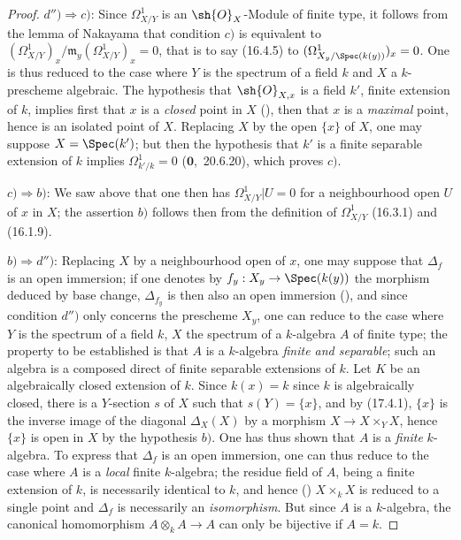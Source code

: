 \begin{proof}
$d'')\Rightarrow c)$: Since $\Omega^1_{X/Y}$ is an $\sh{O}_X$-Module of finite type, it follows from the lemma of Nakayama that condition $c)$ is equivalent to $(\Omega^1_{X/Y})_x/\mathfrak{m}_y(\Omega^1_{X/Y})_x=0$, that is to say (16.4.5) to $(\Omega^1_{X_y/\Spec(k(y))})_x=0$.
One is thus reduced to the case where $Y$ is the spectrum of a field $k$ and $X$ a $k$-prescheme algebraic.
The hypothesis that $\sh{O}_{X,x}$ is a field $k'$, finite extension of $k$, implies first that $x$ is a \emph{closed} point in $X$ (), then that $x$ is a \emph{maximal} point, hence is an isolated point of $X$.
Replacing $X$ by the open $\{x\}$ of $X$, one may suppose $X=\Spec(k')$; but then the hypothesis that $k'$ is a finite separable extension of $k$ implies $\Omega^1_{k'/k}=0$ ($\mathbf{0}$,~20.6.20), which proves $c)$.

$c)\Rightarrow b)$: We saw above that one then has $\Omega^1_{X/Y}|U=0$ for a neighbourhood open $U$ of $x$ in $X$; the assertion $b)$ follows then from the definition of $\Omega^1_{X/Y}$ (16.3.1) and (16.1.9).

$b)\Rightarrow d'')$: Replacing $X$ by a neighbourhood open of $x$, one may suppose that $\Delta_f$ is an open immersion; if one denotes by $f_y:X_y\to\Spec(k(y))$ the morphism deduced by base change, $\Delta_{f_y}$ is then also an open immersion (), and since condition $d'')$ only concerns the prescheme $X_y$, one can reduce to the case where $Y$ is the spectrum of a field $k$, $X$ the spectrum of a $k$-algebra $A$ of finite type; the property to be established is that $A$ is a $k$-algebra \emph{finite and separable}; such an algebra is a composed direct of finite separable extensions of $k$.
Let $K$ be an algebraically closed extension of $k$.
Since $k(x)=k$ since $k$ is algebraically closed, there is a $Y$-section $s$ of $X$ such that $s(Y)=\{x\}$, and by (17.4.1), $\{x\}$ is the inverse image of the diagonal $\Delta_X(X)$ by a morphism $X\to X\times_Y X$, hence $\{x\}$ is open in $X$ by the hypothesis $b)$.
One has thus shown that $A$ is a \emph{finite} $k$-algebra.
To express that $\Delta_f$ is an open immersion, one can thus reduce to the case where $A$ is a \emph{local} finite $k$-algebra; the residue field of $A$, being a finite extension of $k$, is necessarily identical to $k$, and hence () $X\times_k X$ is reduced to a single point and $\Delta_f$ is necessarily an \emph{isomorphism}.
But since $A$ is a $k$-algebra, the canonical homomorphism $A\otimes_k A\to A$ can only be bijective if $A=k$.
\end{proof}

